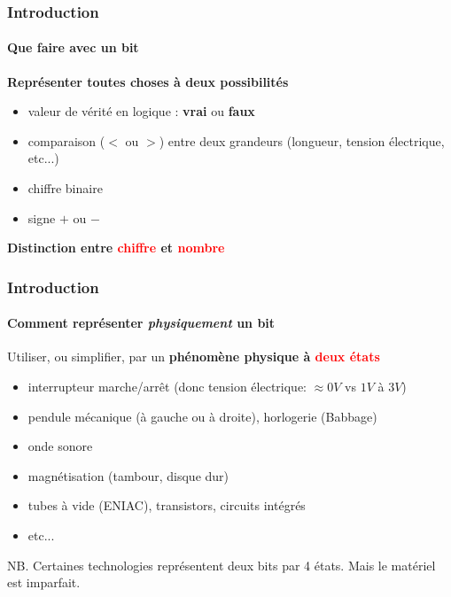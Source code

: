\documentclass[xcolor=svgnames,final,smaller,a4]{beamer}
\begin{document}
\begin{frame}
  \frametitle{Introduction}
  \framesubtitle{Que faire avec un bit}

  
  \textbf{Représenter toutes choses à deux possibilités}
  
  \begin{itemize}

  \item valeur de vérité en logique : \textbf{vrai} ou \textbf{faux}

  \item comparaison ($<$ ou $>$) entre deux grandeurs (longueur, tension électrique, etc...)
  \item chiffre binaire

    \item signe $+$ ou $-$
  \end{itemize}

  \vspace{1cm}

  \textbf{Distinction entre \textcolor{red}{chiffre} et \textcolor{red}{nombre}}
\end{frame}

\begin{frame}
  \frametitle{Introduction}
  \framesubtitle{Comment représenter \emph{physiquement} un bit}

  Utiliser, ou simplifier, par un \textbf{phénomène physique à \textcolor{red}{deux états}}

  \begin{itemize}
  \item interrupteur marche/arrêt (donc tension électrique: $\approx 0V$ vs $1V$ à $3V$)
  \item pendule mécanique (à gauche ou à droite), horlogerie (Babbage)
    \item onde sonore
    \item magnétisation (tambour, disque dur)
  \item tubes à vide (ENIAC), transistors, circuits intégrés
  \item etc...
  \end{itemize}
  
  \vspace{2mm}
 
  NB. Certaines technologies {} représentent deux bits par 4 états. 
  Mais le matériel est imparfait.
\end{frame}
\end{document}
